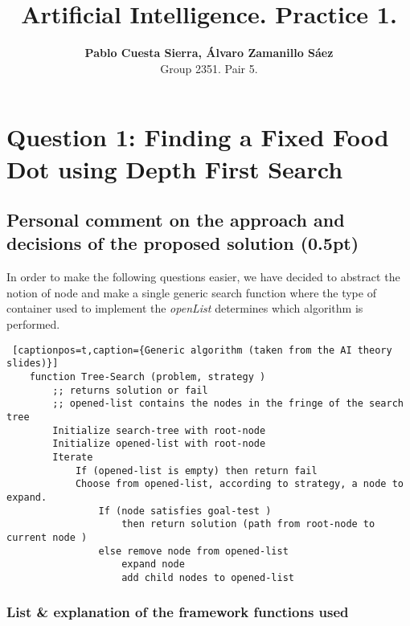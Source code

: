 \documentclass{article}
\begin{document}
\title{\textbf{Artificial Intelligence. Practice 1.}}
\author{\textbf{Pablo Cuesta Sierra, Álvaro Zamanillo Sáez} \\Group 2351. Pair 5.}
\maketitle

\begin{tcolorbox}
\tableofcontents
\end{tcolorbox}


\newpage
\section{Question 1: Finding a Fixed Food Dot using Depth First Search}

\subsection{Personal comment on the approach and decisions of the proposed solution (0.5pt)}\label{search_function}

In order to make the following questions easier, we have decided to abstract the notion of node and make a single generic search function where the type of container used to implement the \emph{openList} determines which algorithm is performed. 

\begin{lstlisting} [captionpos=t,caption={Generic algorithm (taken from the AI theory slides)}]
    function Tree-Search (problem, strategy )
        ;; returns solution or fail
        ;; opened-list contains the nodes in the fringe of the search tree
        Initialize search-tree with root-node
        Initialize opened-list with root-node
        Iterate
            If (opened-list is empty) then return fail
            Choose from opened-list, according to strategy, a node to expand.
                If (node satisfies goal-test )
                    then return solution (path from root-node to current node )
                else remove node from opened-list
                    expand node
                    add child nodes to opened-list 
\end{lstlisting}


\subsubsection{List \& explanation of the framework functions used}
\end{document}
